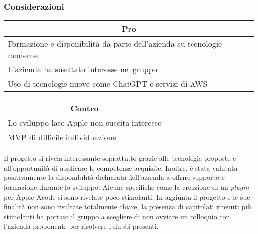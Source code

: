 \subsubsection{Considerazioni}
\begin{minipage}[t]{0.45\linewidth}
    \vspace{0pt}
    {\renewcommand{\arraystretch}{1.5}
    \begin{tabular}{p{1\linewidth}}
        \multicolumn{1}{c}{\textbf{Pro}} \\
        \midrule
        Formazione e disponibilità da parte dell'azienda su tecnologie moderne \\
        L'azienda ha suscitato interesse nel gruppo \\
        Uso di tecnologie nuove come ChatGPT e servizi di AWS \\
        \hline
    \end{tabular}
    }
\end{minipage}
\hspace{0.05\linewidth}
\begin{minipage}[t]{0.45\linewidth}
    \vspace{0pt}
    {\renewcommand{\arraystretch}{1.5}
    \begin{tabular}{p{1\linewidth}}
        \multicolumn{1}{c}{\textbf{Contro}} \\
        \midrule
        Lo sviluppo lato Apple non suscita interesse \\
        MVP di difficile individuazione     \\
        \hline
    \end{tabular}
    }
\end{minipage}
\vspace{1em} 

\noindent
Il progetto si rivela interessante soprattutto grazie alle tecnologie proposte e all'opportunità di applicare le competenze acquisite. 
Inoltre, è stata valutata positivamente la disponibilità dichiarata dell'azienda a offrire supporto e formazione durante lo sviluppo.
Alcune specifiche come la creazione di un \textit{plugin} per Apple Xcode si sono rivelate poco stimolanti. 
In aggiunta il progetto e le sue finalità non sono risultate totalmente chiare, la presenza di capitolati ritenuti più stimolanti ha portato il gruppo a scegliere di non avviare un colloquio con l'azienda proponente per risolvere i dubbi presenti.
